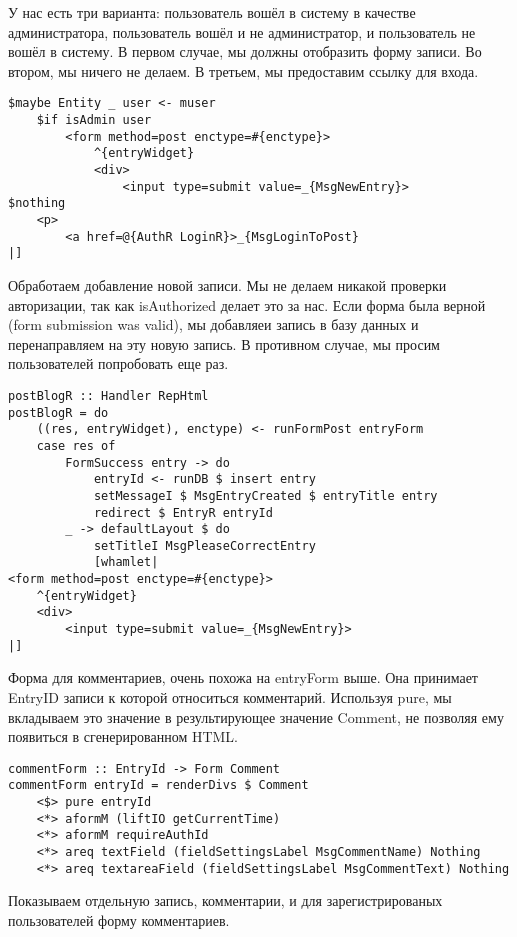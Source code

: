 У нас есть три варианта: пользователь вошёл в систему в качестве администратора, пользователь вошёл и не администратор, и пользователь не вошёл в систему. В первом случае, мы должны отобразить форму записи. Во втором, мы ничего не делаем. В третьем, мы предоставим ссылку для входа. 
 
\begin{lstlisting}
$maybe Entity _ user <- muser
    $if isAdmin user
        <form method=post enctype=#{enctype}>
            ^{entryWidget}
            <div>
                <input type=submit value=_{MsgNewEntry}>
$nothing
    <p>
        <a href=@{AuthR LoginR}>_{MsgLoginToPost}
|]
\end{lstlisting}
 
Обработаем добавление новой записи. Мы не делаем никакой проверки авторизации, так как isAuthorized делает это за нас. Если форма была верной (form submission was valid), мы добавляеи запись в базу данных и перенаправляем на эту новую запись. В противном случае, мы просим пользователей попробовать еще раз. 
 
\begin{lstlisting}
postBlogR :: Handler RepHtml
postBlogR = do
    ((res, entryWidget), enctype) <- runFormPost entryForm
    case res of
        FormSuccess entry -> do
            entryId <- runDB $ insert entry
            setMessageI $ MsgEntryCreated $ entryTitle entry
            redirect $ EntryR entryId
        _ -> defaultLayout $ do
            setTitleI MsgPleaseCorrectEntry
            [whamlet|
<form method=post enctype=#{enctype}>
    ^{entryWidget}
    <div>
        <input type=submit value=_{MsgNewEntry}>
|]
\end{lstlisting}
 
Форма для комментариев, очень похожа на entryForm выше. Она принимает EntryID записи к которой относиться комментарий. Используя pure, мы вкладываем это значение в результирующее значение Comment, не позволяя ему появиться в сгенерированном HTML. 
 
\begin{lstlisting}
commentForm :: EntryId -> Form Comment
commentForm entryId = renderDivs $ Comment
    <$> pure entryId
    <*> aformM (liftIO getCurrentTime)
    <*> aformM requireAuthId
    <*> areq textField (fieldSettingsLabel MsgCommentName) Nothing
    <*> areq textareaField (fieldSettingsLabel MsgCommentText) Nothing
\end{lstlisting}
 
Показываем отдельную запись, комментарии, и для зарегистрированых пользователей форму комментариев.
 
